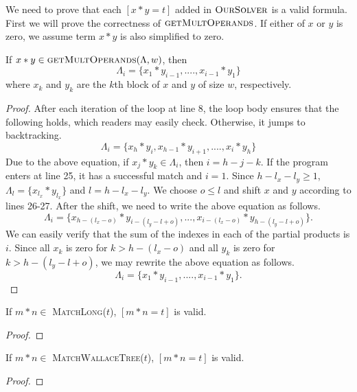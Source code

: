 We need to prove that each $[x*y = t]$ added in $\textsc{OurSolver}$
is a valid formula.
%
First we will prove the correctness of $\textsc{getMultOperands}$.
%
If either of $x$ or $y$ is zero, we assume term $x*y$ is also simplified to zero.
\begin{thm}
 If $ x*y \in \textsc{getMultOperands}(\Lambda,w)$, then
 $$
 \Lambda_i = \{ x_1*y_{i-1},....,x_{i-1}*y_1 \}
 $$
  where $x_k$ and $y_k$ are the $k$th block of $x$ and $y$ of size
$w$, respectively.
\end{thm}
\begin{proof}
  After each iteration of the loop at line 8,
  the loop body ensures that the following holds, which readers 
  may easily check.
  Otherwise, it jumps to backtracking.
  $$
  \Lambda_i = \{ x_h*y_{i}, x_{h-1}*y_{i+1},....,x_{i}*y_h \}
  $$
  Due to the above equation,
  if $x_j*y_k \in \Lambda_i$, then $ i = h-j-k$.
  If the program enters at line 25, it has a successful match and $i=1$.
  Since $h-l_x -l_y \geq 1$, $\Lambda_l = \{x_{l_x}*y_{l_x}\}$
  and $l = h - l_x - l_y$.
  We choose $o \leq l$ and shift $x$ and $y$ according to lines 26-27.
  After the shift, we need to write the above equation as follows.
  $$
  \Lambda_i = \{ x_{h-(l_x-o)}*y_{i-(l_y-l+o)},...,x_{i-(l_x-o)}*y_{h-(l_y-l+o)} \}.
  $$
  We can easily verify that the sum of the indexes in each of the partial products
  is $i$.
  Since all $x_k$ is zero for $k > h-(l_x-o)$ and all $y_k$ is zero for $k > h-(l_y-l+o)$,
  we may rewrite the above equation as follows.
  $$
  \Lambda_i = \{ x_1*y_{i-1},....,x_{i-1}*y_1 \}.
  $$
\end{proof}

\begin{thm}
  If $m*n\in$ \textsc{MatchLong}($t$), $[m*n = t]$ is valid.
\end{thm}
\begin{proof}
  
\end{proof}

\begin{thm}
  If $m*n\in$ \textsc{MatchWallaceTree}($t$), $[m*n = t]$ is valid.
\end{thm}
\begin{proof}
  
\end{proof}


